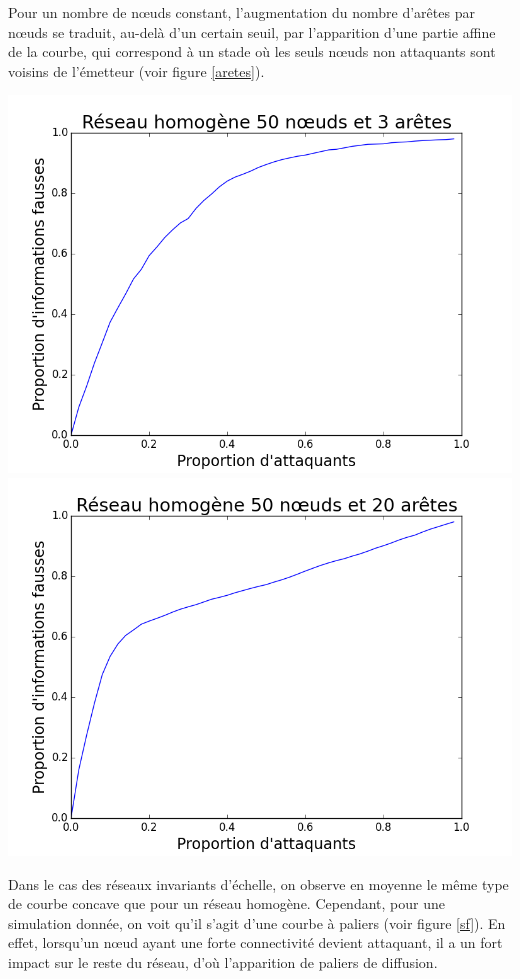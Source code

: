 \documentclass[12pt,a4paper]{article}
\begin{document}
Pour un nombre de nœuds constant, l'augmentation du nombre d'arêtes par nœuds se traduit, au-delà d'un certain seuil, par l'apparition d'une partie affine de la courbe, qui correspond à un stade où les seuls nœuds non attaquants sont voisins de l'émetteur (voir figure \ref{aretes}).

\begin{center}
\includegraphics[width=0.49\linewidth]{../resultats/atkaleat/atkaleat-50-3-2-i100.png}
\includegraphics[width=0.49\linewidth]{../resultats/atkaleat/atkaleat-50-20-2-i100.png}
 \label{aretes}
\end{center}

Dans le cas des réseaux invariants d'échelle, on observe en moyenne le même type de courbe concave que pour un réseau homogène.
Cependant, pour une simulation donnée, on voit qu'il s'agit d'une courbe à paliers (voir figure \ref{sf}).
En effet, lorsqu'un nœud ayant une forte connectivité devient attaquant, il a un fort impact sur le reste du réseau, d'où l'apparition de paliers de diffusion.
\end{document}
